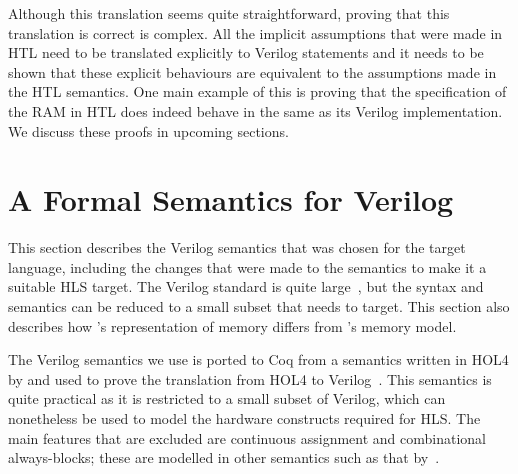 Although this translation seems quite straight\-forward, proving that this translation is correct is complex.
All the implicit assumptions that were made in HTL need to be translated explicitly to Verilog statements and it needs to be shown that these explicit behaviours are equivalent to the assumptions made in the HTL semantics.  One main example of this is proving that the specification of the RAM in HTL does indeed behave in the same as its Verilog implementation.
We discuss these proofs in upcoming sections.


\section{A Formal Semantics for Verilog}\label{sec:verilog}

\newcommand{\alwaysblock}{always-block}

This section describes the Verilog semantics that was chosen for the target language, including the changes that were made to the semantics to make it a suitable HLS target.  The Verilog standard is quite large~\cite{06_ieee_stand_veril_hardw_descr_languag,05_ieee_stand_veril_regis_trans_level_synth}, but the syntax and semantics can be reduced to a small subset that \vericert{} needs to target.  This section  also describes how \vericert{}'s representation of memory differs from \compcert{}'s memory model.

The Verilog semantics we use is ported to Coq from a semantics written in HOL4 by \textcite{loow19_proof_trans_veril_devel_hol} and used to prove the translation from HOL4 to Verilog~\cite{loow19_verif_compil_verif_proces}. %
This semantics is quite practical as it is restricted to a small subset of Verilog, which can nonetheless be used to model the hardware constructs required for HLS.  The main features that are excluded are continuous assignment and combinational \alwaysblock{}s; these are modelled in other semantics such as that by~\textcite{meredith10_veril}. %


